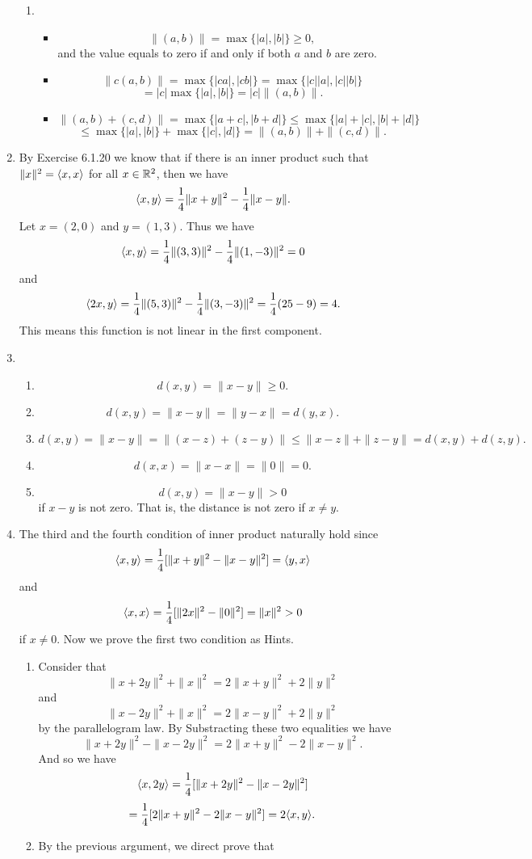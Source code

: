 \begin{enumerate}
\begin{enumerate}
\item \begin{itemize}
\item \[\|(a,b)\|=\max\{|a|,|b|\}\geq 0,\]
and the value equals to zero if and only if both $a$ and $b$ are zero.
\item \[\|c(a,b)\|=\max\{|ca|,|cb|\}=\max\{|c||a|,|c||b|\}\]
\[=|c|\max\{|a|,|b|\}=|c|\|(a,b)\|.\]
\item \[\|(a,b)+(c,d)\|=\max\{|a+c|,|b+d|\}\leq \max\{|a|+|c|,|b|+|d|\}\]
\[\leq \max\{|a|,|b|\}+\max\{|c|,|d|\}=\|(a,b)\|+\|(c,d)\|.\]
\end{itemize}
\end{enumerate}
\item By Exercise 6.1.20 we know that if there is an inner product such that $\|x\|^2=\langle x,x\rangle $ for all $x\in \mathbb{R}^2$, then we have 
\[\langle x,y\rangle =\frac{1}{4}\|x+y\|^2-\frac{1}{4}\|x-y\|.\]
Let $x=(2,0)$ and $y=(1,3)$. Thus we have 
\[\langle x,y\rangle =\frac{1}{4}\|(3,3)\|^2-\frac{1}{4}\|(1,-3)\|^2=0\]
and 
\[\langle 2x,y\rangle =\frac{1}{4}\|(5,3)\|^2-\frac{1}{4}\|(3,-3)\|^2=\frac{1}{4}(25-9)=4.\]
This means this function is not linear in the first component.
\item \begin{enumerate}
\item \[d(x,y)=\|x-y\|\geq 0.\]
\item \[d(x,y)=\|x-y\|=\|y-x\|=d(y,x).\]
\item \[d(x,y)=\|x-y\|=\|(x-z)+(z-y)\|\leq \|x-z\|+\|z-y\|=d(x,y)+d(z,y).\]
\item \[d(x,x)=\|x-x\|=\|0\|=0.\]
\item \[d(x,y)=\|x-y\|>0\]
if $x-y$ is not zero. That is, the distance is not zero if $x\neq y$.
\end{enumerate}
\item The third and the fourth condition of inner product naturally hold since 
\[\langle x,y\rangle =\frac{1}{4}[\|x+y\|^2-\|x-y\|^2]=\langle y,x\rangle\]
and 
\[\langle x,x\rangle =\frac{1}{4}[\|2x\|^2-\|0\|^2]=\|x\|^2>0\]
if $x\neq 0$. Now we prove the first two condition as Hints.
\begin{enumerate}
\item Consider that 
\[\|x+2y\|^2+\|x\|^2=2\|x+y\|^2+2\|y\|^2\]
and 
\[\|x-2y\|^2+\|x\|^2=2\|x-y\|^2+2\|y\|^2\]
by the parallelogram law. By Substracting these two equalities we have 
\[\|x+2y\|^2-\|x-2y\|^2=2\|x+y\|^2-2\|x-y\|^2.\]
And so we have 
\[\langle x,2y\rangle =\frac{1}{4}[\|x+2y\|^2-\|x-2y\|^2]\]
\[=\frac{1}{4}[2\|x+y\|^2-2\|x-y\|^2]=2\langle x,y\rangle .\]
\item By the previous argument, we direct prove that 

\end{enumerate}
\end{enumerate}
